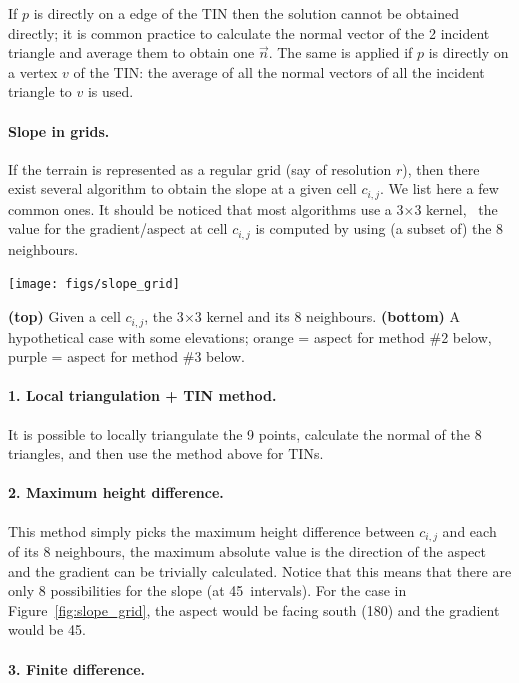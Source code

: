 If $p$ is directly on a edge of the TIN then the solution cannot be obtained directly; it is common practice to calculate the normal vector of the 2 incident triangle and average them to obtain one $\vec{n}$.
The same is applied if $p$ is directly on a vertex $v$ of the TIN: the average of all the normal vectors of all the incident triangle to $v$ is used.


\paragraph{Slope in grids.}

If the terrain is represented as a regular grid (say of resolution $r$), then there exist several algorithm to obtain the slope at a given cell $c_{i,j}$.
We list here a few common ones.
It should be noticed that most algorithms use a 3$\times$3 kernel, \ie\ the value for the gradient/aspect at cell $c_{i,j}$ is computed by using (a subset of) the 8 neighbours.
\begin{marginfigure}
  \centering
  \texttt{[image: figs/slope\_grid]}
  \caption{\textbf{(top)} Given a cell $c_{i,j}$, the 3$\times$3 kernel and its 8 neighbours. \textbf{(bottom)} A hypothetical case with some elevations; orange = aspect for method \#2 below, purple = aspect for method \#3 below.}%
\label{fig:slope_grid}
\end{marginfigure}


\paragraph{1. Local triangulation + TIN method.}
It is possible to locally triangulate the 9 points, calculate the normal of the 8 triangles, and then use the method above for TINs.


\paragraph{2. Maximum height difference.}
This method simply picks the maximum height difference between $c_{i,j}$ and each of its 8 neighbours, the maximum absolute value is the direction of the aspect and the gradient can be trivially calculated.
Notice that this means that there are only 8 possibilities for the slope (at 45\degree\ intervals).
For the case in Figure~\ref{fig:slope_grid}, the aspect would be facing south (180\degree) and the gradient would be 45\degree.


\paragraph{3. Finite difference.}

